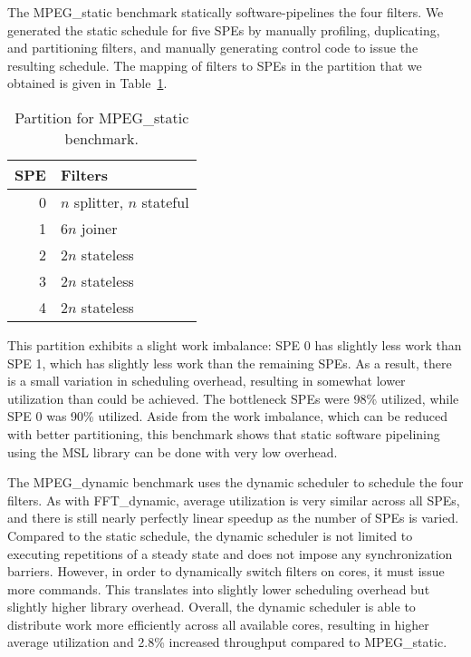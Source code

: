 The \textsf{MPEG\_static} benchmark statically software-pipelines the four filters.
We generated the static schedule for five SPEs by manually profiling, duplicating, and
partitioning filters, and manually generating control code to issue the resulting schedule.
The mapping of filters to SPEs in the partition that we obtained is given in
Table~\ref{fig:perf:mpegs}.

\begin{table}[!htb]
\begin{center}
\begin{tabular}{|r|l|}
\hline
SPE & Filters \\
\hline
0 & $n$ splitter, $n$ stateful \\
\hline
1 & $6n$ joiner \\
\hline
2 & $2n$ stateless \\
\hline
3 & $2n$ stateless \\
\hline
4 & $2n$ stateless \\
\hline
\end{tabular}
\end{center}
\caption{Partition for \textsf{MPEG\_static} benchmark.}
\label{fig:perf:mpegs}
\end{table}

This partition exhibits a slight work imbalance: SPE 0 has slightly less work than SPE 1,
which has slightly less work than the remaining SPEs.
As a result, there is a small variation in scheduling overhead, resulting in somewhat lower
utilization than could be achieved.
The bottleneck SPEs were 98\% utilized, while SPE 0 was 90\% utilized.
Aside from the work imbalance, which can be reduced with better partitioning,
this benchmark shows that static software pipelining using the MSL library can be done
with very low overhead.

The \textsf{MPEG\_dynamic} benchmark uses the dynamic scheduler to schedule the four filters.
As with \textsf{FFT\_dynamic}, average utilization is very similar across all SPEs,
and there is still nearly perfectly linear speedup as the number of SPEs is varied.
Compared to the static schedule, the dynamic scheduler is not limited to executing
repetitions of a steady state and does not impose any synchronization barriers.
However, in order to dynamically switch filters on cores, it must issue more commands.
This translates into slightly lower scheduling overhead but slightly higher library overhead.
Overall, the dynamic scheduler is able to distribute work more efficiently across
all available cores, resulting in higher average utilization and 2.8\% increased throughput
compared to \textsf{MPEG\_static}.


